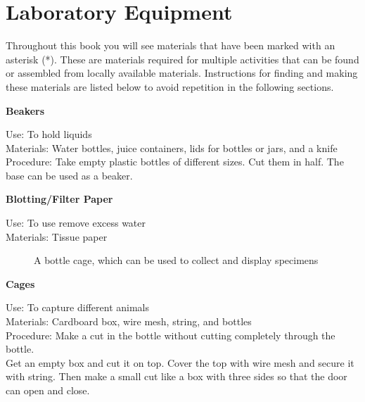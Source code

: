 \chapter{Laboratory Equipment}
Throughout this book you will see materials that have been marked with an asterisk (*). These are materials required for multiple activities that can be found or assembled from locally available materials. Instructions for finding and making these materials are listed below to avoid repetition in the following sections.

\begin{flushleft}
\textbf{Beakers}
\end{flushleft}
\vspace{-10pt}
Use: To hold liquids\\
Materials: Water bottles, juice containers, lids for bottles or jars, and a knife\\
Procedure: Take empty plastic bottles of different sizes. Cut them in half. The base can be used as a beaker.\\

%
\begin{flushleft}
\textbf{Blotting/Filter Paper}
\end{flushleft}
\vspace{-10pt}
Use: To use remove excess water\\
Materials: Tissue paper \\

\begin{figure}[h]
\begin{center}
\def\svgwidth{2.5cm}

\caption{A bottle cage, which can be used to collect and display specimens}
\label{fig:bottle-cage}
\end{center}
\end{figure}

\begin{flushleft}
\textbf{Cages}
\end{flushleft}
\vspace{-10pt}
Use: To capture different animals\\
Materials: Cardboard box, wire mesh, string, and bottles\\
Procedure: Make a cut in the bottle without cutting completely through the bottle.\\Get an empty box and cut it on top. Cover the top with wire mesh and secure it with string. Then make a small cut like a box with three sides so that the door can open and close.  

